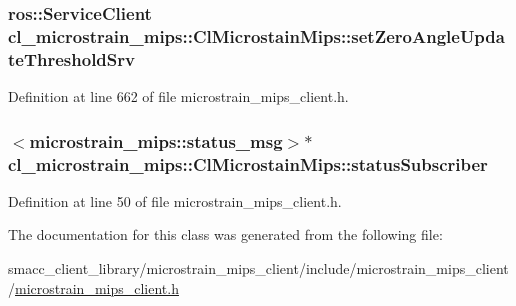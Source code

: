 \subsubsection[{\texorpdfstring{set\+Zero\+Angle\+Update\+Threshold\+Srv}{setZeroAngleUpdateThresholdSrv}}]{\setlength{\rightskip}{0pt plus 5cm}ros\+::\+Service\+Client cl\+\_\+microstrain\+\_\+mips\+::\+Cl\+Microstain\+Mips\+::set\+Zero\+Angle\+Update\+Threshold\+Srv\hspace{0.3cm}{\ttfamily [protected]}}\hypertarget{classcl__microstrain__mips_1_1ClMicrostainMips_a88ffc1e573993764bb130c97cc64fe08}{}\label{classcl__microstrain__mips_1_1ClMicrostainMips_a88ffc1e573993764bb130c97cc64fe08}


Definition at line 662 of file microstrain\+\_\+mips\+\_\+client.\+h.

\subsubsection[{\texorpdfstring{status\+Subscriber}{statusSubscriber}}]{$<$microstrain\+\_\+mips\+::status\+\_\+msg$>$$\ast$ cl\+\_\+microstrain\+\_\+mips\+::\+Cl\+Microstain\+Mips\+::status\+Subscriber}\hypertarget{classcl__microstrain__mips_1_1ClMicrostainMips_a0da593a071ac7ff8dd842b934120e315}{}\label{classcl__microstrain__mips_1_1ClMicrostainMips_a0da593a071ac7ff8dd842b934120e315}


Definition at line 50 of file microstrain\+\_\+mips\+\_\+client.\+h.



The documentation for this class was generated from the following file\+:\begin{DoxyCompactItemize}
\item 
smacc\+\_\+client\+\_\+library/microstrain\+\_\+mips\+\_\+client/include/microstrain\+\_\+mips\+\_\+client/\hyperlink{microstrain__mips__client_8h}{microstrain\+\_\+mips\+\_\+client.\+h}\end{DoxyCompactItemize}
